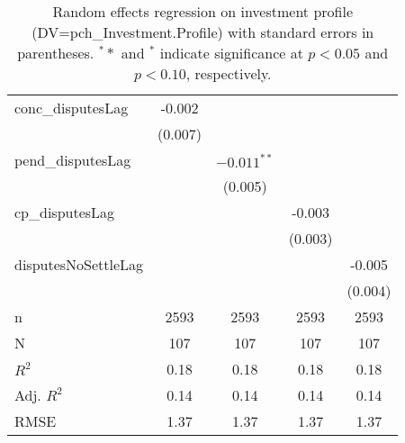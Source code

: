 \begin{table}[ht]
\begin{tabular}{lcccc}
  conc\_disputesLag & -0.002 &  &  &  \\ 
   & (0.007) &  &  &  \\ 
  pend\_disputesLag &  & $-0.011^{\ast\ast}$ &  &  \\ 
   &  & (0.005) &  &  \\ 
  cp\_disputesLag &  &  & -0.003 &  \\ 
   &  &  & (0.003) &  \\ 
  disputesNoSettleLag &  &  &  & -0.005 \\ 
   &  &  &  & (0.004) \\ 
   \hline
n & 2593 & 2593 & 2593 & 2593 \\ 
  N & 107 & 107 & 107 & 107 \\ 
  $R^{2}$ & 0.18 & 0.18 & 0.18 & 0.18 \\ 
  Adj. $R^{2}$ & 0.14 & 0.14 & 0.14 & 0.14 \\ 
  RMSE & 1.37 & 1.37 & 1.37 & 1.37 \\ 
   \hline
\hline
\end{tabular}
\caption{Random effects regression on investment profile (DV=pch\_Investment.Profile) with standard errors in parentheses. $^**$ and $^*$ indicate significance at $p< 0.05 $ and $p< 0.10 $, respectively.} 
\end{table}
